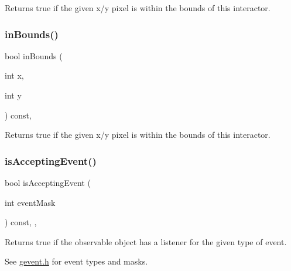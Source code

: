 Returns true if the given x/y pixel is within the bounds of this interactor. 

\mbox{\label{classsgl_1_1GInteractor_ae6d7982c1c627b677a5e776ca86118ed}} 
\subsubsection{\texorpdfstring{in\+Bounds()}{inBounds()}\hspace{0.1cm}{\footnotesize\ttfamily [2/2]}}
{\footnotesize\ttfamily bool in\+Bounds (\begin{DoxyParamCaption}\item[{int}]{x,  }\item[{int}]{y }\end{DoxyParamCaption}) const\hspace{0.3cm}{\ttfamily [virtual]}, {\ttfamily [inherited]}}



Returns true if the given x/y pixel is within the bounds of this interactor. 

\mbox{\label{classsgl_1_1GObservable_aeec1adc19aa0f33de62390686ee1382c}} 
\subsubsection{\texorpdfstring{is\+Accepting\+Event()}{isAcceptingEvent()}\hspace{0.1cm}{\footnotesize\ttfamily [1/3]}}
{\footnotesize\ttfamily bool is\+Accepting\+Event (\begin{DoxyParamCaption}\item[{int}]{event\+Mask }\end{DoxyParamCaption}) const\hspace{0.3cm}{\ttfamily [protected]}, {\ttfamily [virtual]}, {\ttfamily [inherited]}}



Returns true if the observable object has a listener for the given type of event. 

See \mbox{\hyperlink{gevent_8h_source}{gevent.\+h}} for event types and masks. \mbox{\label{classsgl_1_1GObservable_aa31c73145a29dcb92848a92e0cfaea41}} 
